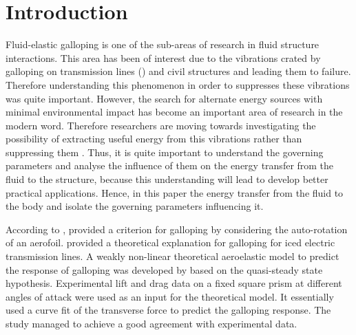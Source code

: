 \section{Introduction} 
 
Fluid-elastic galloping is one of the sub-areas of research in fluid structure interactions. This area has been of interest due to the vibrations crated by galloping on transmission lines (\cite{Parkinson1964}) and civil structures and leading them to failure. Therefore understanding this phenomenon in order to suppresses these vibrations was quite important. However, the search for alternate energy sources with minimal environmental impact has become an important area of research in the modern word. Therefore researchers are moving towards investigating the possibility of extracting useful energy from this vibrations rather than suppressing them \cite{Barrero-Gil2010a}. Thus, it is quite important to understand the governing parameters and analyse the influence of them on the energy transfer from the fluid to the structure, because this understanding will lead to develop better practical applications. Hence, in this paper the energy transfer from the fluid to the body and isolate the governing parameters influencing it.

According to \citet{Paidoussis2010}, \citet{Glauert1919} provided a criterion for galloping by considering the auto-rotation of an aerofoil.  \citet{DenHartog1956} provided a theoretical explanation for galloping for iced electric transmission lines. A weakly non-linear theoretical aeroelastic model to predict the response of galloping was developed by \citet{Parkinson1964} based on the quasi-steady state hypothesis. Experimental lift and drag data on a fixed square prism at different angles of attack were used as an input for the theoretical model. It essentially used a curve fit of the transverse force to predict the galloping response. The study managed to achieve a good agreement with experimental data.

